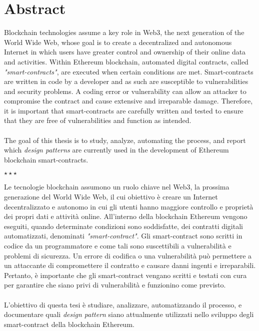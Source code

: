 \chapter*{Abstract}\label{abstract}
Blockchain technologies assume a key role in Web3, the next generation of the World Wide Web, whose goal is to create a decentralized and autonomous Internet in which users have greater control and ownership of their online data and activities. Within Ethereum blockchain, automated digital contracts, called \textit{"smart-contracts"}, are executed when certain conditions are met. Smart-contracts are written in code by a developer and as such are susceptible to vulnerabilities and security problems. A coding error or vulnerability can allow an attacker to compromise the contract and cause extensive and irreparable damage. Therefore, it is important that smart-contracts are carefully written and tested to ensure that they are free of vulnerabilities and function as intended.\\
\\
The goal of this thesis is to study, analyze, automating the process, and report which \textit{design patterns} are currently used in the development of Ethereum blockchain smart-contracts.
\vspace{20pt}
\begin{center}
\large$\star\star\star$
\end{center}
\vspace{20pt}
Le tecnologie blockchain assumono un ruolo chiave nel Web3, la prossima generazione del World Wide Web, il cui obiettivo è creare un Internet decentralizzato e autonomo in cui gli utenti hanno maggiore controllo e proprietà dei propri dati e attività online. All'interno della blockchain Ethereum vengono eseguiti, quando determinate condizioni sono soddisfatte, dei contratti digitali automatizzati, denominati \textit{"smart-contract"}. Gli smart-contract sono scritti in codice da un programmatore e come tali sono suscettibili a vulnerabilità e problemi di sicurezza. Un errore di codifica o una vulnerabilità può permettere a un attaccante di compromettere il contratto e causare danni ingenti e irreparabili. Pertanto, è importante che gli smart-contract vengano scritti e testati con cura per garantire che siano privi di vulnerabilità e funzionino come previsto.\\
\\
L'obiettivo di questa tesi è studiare, analizzare, automatizzando il processo, e documentare quali \textit{design pattern} siano attualmente utilizzati nello sviluppo degli smart-contract della blockchain Ethereum.
 
